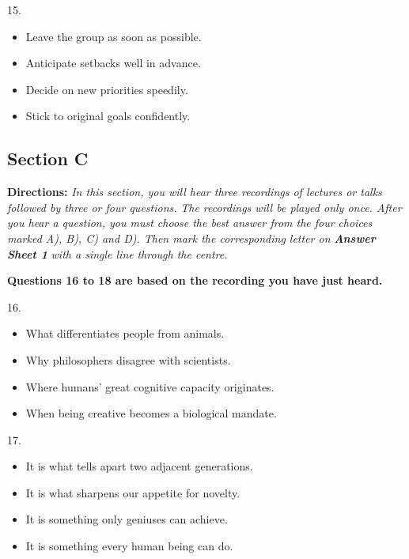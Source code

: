 \documentclass[UTF8,11pt]{ctexart}
\begin{document}
15.


\begin{itemize}[leftmargin=2em,itemsep=.2em,topsep=.4em]\item[A.] Leave the group as soon as possible.
\item[B.] Anticipate setbacks well in advance.
\item[C.] Decide on new priorities speedily.
\item[D.] Stick to original goals confidently.
\end{itemize}

\subsection*{\textbf{Section C}}


\textbf{Directions:}\textit{ In this section, you will hear three recordings of lectures or talks followed by three or four questions.} \textit{The recordings will be played only once. After you hear a question, you must choose the best answer from the four} \textit{choices marked A), B), C) and D). Then mark the corresponding letter on }\textbf{\textit{Answer Sheet 1}}\textit{ with a single line} \textit{through the centre.}


\textbf{Questions 16 to 18 are based on the recording you have just heard.}


16.


\begin{itemize}[leftmargin=2em,itemsep=.2em,topsep=.4em]\item[A.] What differentiates people from animals.
\item[B.] Why philosophers disagree with scientists.
\item[C.] Where humans’ great cognitive capacity originates.
\item[D.] When being creative becomes a biological mandate.
\end{itemize}

17.


\begin{itemize}[leftmargin=2em,itemsep=.2em,topsep=.4em]\item[A.] It is what tells apart two adjacent generations.
\item[B.] It is what sharpens our appetite for novelty.
\item[C.] It is something only geniuses can achieve.
\item[D.] It is something every human being can do.
\end{itemize}
\end{document}
